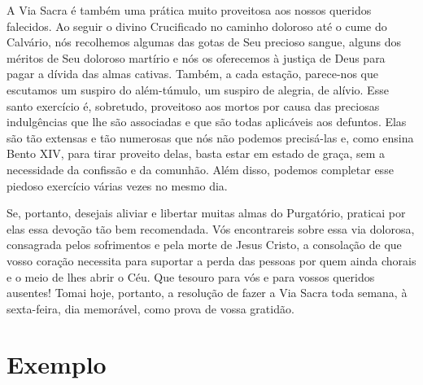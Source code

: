 A Via Sacra é também uma prática muito proveitosa aos nossos queridos falecidos. Ao seguir o divino Crucificado no caminho doloroso até o cume do Calvário, nós recolhemos algumas das gotas de Seu precioso sangue, alguns dos méritos de Seu doloroso martírio e nós os oferecemos à justiça de Deus para pagar a dívida das almas cativas. Também, a cada estação, parece-nos que escutamos um suspiro do além-túmulo, um suspiro de alegria, de alívio. Esse santo exercício é, sobretudo, proveitoso aos mortos por causa das preciosas indulgências que lhe são associadas e que são todas aplicáveis aos defuntos. Elas são tão extensas e tão numerosas que nós não podemos precisá-las e, como ensina Bento XIV, para tirar proveito delas, basta estar em estado de graça, sem a necessidade da confissão e da comunhão. Além disso, podemos completar esse piedoso exercício várias vezes no mesmo dia.

Se, portanto, desejais aliviar e libertar muitas almas do Purgatório, praticai por elas essa devoção tão bem recomendada. Vós encontrareis sobre essa via dolorosa, consagrada pelos sofrimentos e pela morte de Jesus Cristo, a consolação de que vosso coração necessita para suportar a perda das pessoas por quem ainda chorais e o meio de lhes abrir o Céu. Que tesouro para vós e para vossos queridos ausentes! Tomai hoje, portanto, a resolução de fazer a Via Sacra toda semana, à sexta-feira, dia memorável, como prova de vossa gratidão.


\section*{Exemplo}

